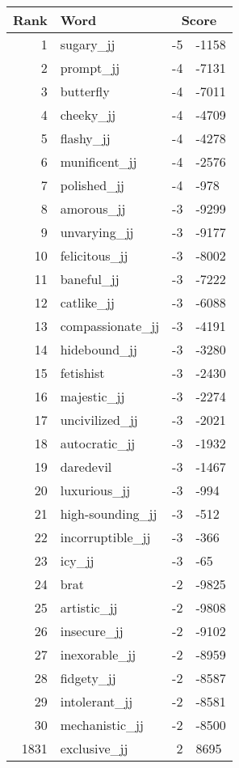 \begin{longtable}[!htbp]{| rlr@{.}l |}
    \hline
    \textbf{Rank} & \textbf{Word} & \multicolumn{2}{c|}{\textbf{Score}} \\
    \hline
    \endhead
    1 & sugary\_jj & -5 & -1158 \\
    2 & prompt\_jj & -4 & -7131 \\
    3 & butterfly & -4 & -7011 \\
    4 & cheeky\_jj & -4 & -4709 \\
    5 & flashy\_jj & -4 & -4278 \\
    6 & munificent\_jj & -4 & -2576 \\
    7 & polished\_jj & -4 & -978 \\
    8 & amorous\_jj & -3 & -9299 \\
    9 & unvarying\_jj & -3 & -9177 \\
    10 & felicitous\_jj & -3 & -8002 \\
    11 & baneful\_jj & -3 & -7222 \\
    12 & catlike\_jj & -3 & -6088 \\
    13 & compassionate\_jj & -3 & -4191 \\
    14 & hidebound\_jj & -3 & -3280 \\
    15 & fetishist & -3 & -2430 \\
    16 & majestic\_jj & -3 & -2274 \\
    17 & uncivilized\_jj & -3 & -2021 \\
    18 & autocratic\_jj & -3 & -1932 \\
    19 & daredevil & -3 & -1467 \\
    20 & luxurious\_jj & -3 & -994 \\
    21 & high-sounding\_jj & -3 & -512 \\
    22 & incorruptible\_jj & -3 & -366 \\
    23 & icy\_jj & -3 & -65 \\
    24 & brat & -2 & -9825 \\
    25 & artistic\_jj & -2 & -9808 \\
    26 & insecure\_jj & -2 & -9102 \\
    27 & inexorable\_jj & -2 & -8959 \\
    28 & fidgety\_jj & -2 & -8587 \\
    29 & intolerant\_jj & -2 & -8581 \\
    30 & mechanistic\_jj & -2 & -8500 \\
    1831 & exclusive\_jj & 2 & 8695 \\

\end{longtable}
